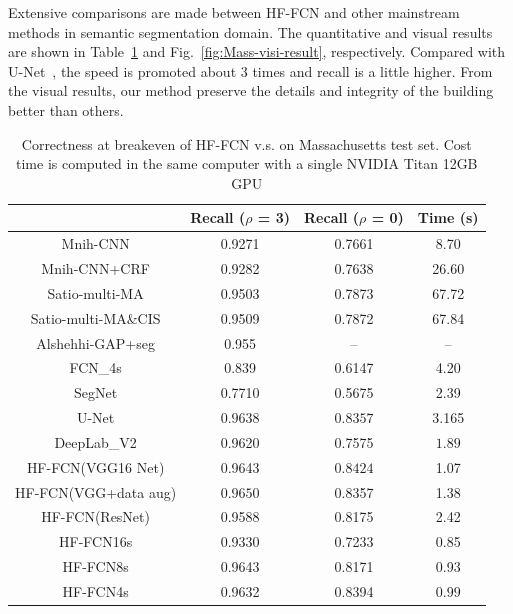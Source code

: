 Extensive comparisons are made between HF-FCN and other mainstream methods in semantic segmentation domain. The quantitative and visual results are shown in Table~\ref{table:Mass-results} and Fig.~\ref{fig:Mass-visi-result}, respectively. 
Compared with U-Net~\cite{IEEEexample:ronneberger2015u}, the speed is promoted about 3 times and recall is a little higher. 
From the visual results, our method preserve the details and integrity of the building better than others.
\begin{table}
\centering
\caption {Correctness at breakeven of HF-FCN v.s. \cite{IEEEexample:mnih2013machine}\cite{IEEEexample:saito2016multiple}\cite{IEEEexample:alshehhi2017simultaneous}\cite{IEEEexample:Long_2015_CVPR}\cite{IEEEexample:badrinarayanan2017segnet}
\cite{IEEEexample:ronneberger2015u}\cite{IEEEexample:chen2016deeplab}on Massachusetts test set. Cost time is computed in the same computer with a single NVIDIA Titan 12GB GPU}
\label{table:Mass-results}
\begin{tabular}{cccc}
\hline
&Recall ($\rho$ = 3)&Recall ($\rho$ = 0)&Time (s)\\
\hline
Mnih-CNN \cite{IEEEexample:mnih2013machine}&0.9271&0.7661&8.70\\
Mnih-CNN+CRF\cite{IEEEexample:mnih2013machine} &0.9282&0.7638&26.60\\
Satio-multi-MA \cite{IEEEexample:saito2016multiple}&0.9503&0.7873&67.72\\
Satio-multi-MA\&CIS \cite{IEEEexample:saito2016multiple}&0.9509&0.7872&67.84\\
Alshehhi-GAP+seg \cite{IEEEexample:alshehhi2017simultaneous}&0.955&{--}&{--} \\ \hline
FCN\_4s\cite{IEEEexample:Long_2015_CVPR}&0.839&0.6147&4.20\\
SegNet\cite{IEEEexample:badrinarayanan2017segnet}&0.7710&0.5675&2.39\\
U-Net\cite{IEEEexample:ronneberger2015u}& $\bm{0.9638}$& $\bm{0.8357}$& 3.165\\
DeepLab\_V2\cite{IEEEexample:chen2016deeplab}&0.9620&0.7575&$\bm{1.89}$\\ \hline
HF-FCN(VGG16 Net)&0.9643& $\bm{0.8424}$ &1.07\\
HF-FCN(VGG+data aug)&$\bm{0.9650}$&0.8357&1.38\\
HF-FCN(ResNet)&0.9588&0.8175&2.42\\
HF-FCN16s &0.9330&0.7233&0.85\\
HF-FCN8s &0.9643&0.8171&0.93\\
HF-FCN4s &0.9632&0.8394&$\bm{0.99}$\\
\hline
\end{tabular}
\end{table}

